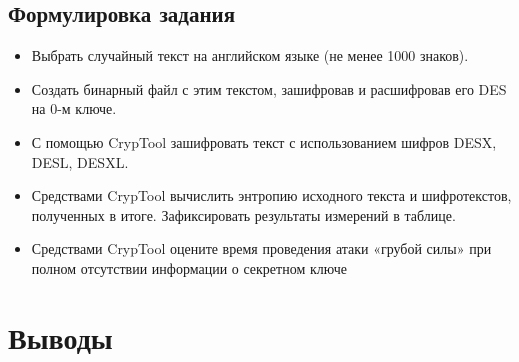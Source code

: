 \documentclass[a4paper, 14pt]{extarticle}
\begin{document}
\subsection{Формулировка задания}
\begin{itemize}
    \item Выбрать случайный текст на английском языке (не менее 1000 знаков).
    \item Создать бинарный файл с этим текстом, зашифровав и расшифровав его DES на 0-м ключе.
    \item С помощью CrypTool зашифровать текст с использованием шифров DESX, DESL, DESXL.\@
    \item Средствами CrypTool вычислить энтропию исходного текста и шифротекстов, полученных в итоге. Зафиксировать результаты измерений в таблице.
    \item Средствами CrypTool оцените время проведения атаки «грубой силы» при полном отсутствии информации о секретном ключе
\end{itemize}


\section*{Выводы}
\lipsum[1] %
\end{document}
